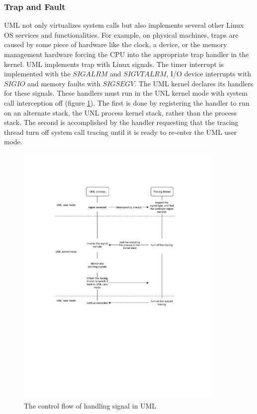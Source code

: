 \subsubsection{Trap and Fault}


UML not only virtualizes system calls but also implements several other Linux OS services and functionalities. For example, on physical machines, traps are caused by some piece of hardware like the clock, a device, or the memory management hardware forcing the CPU into the appropriate trap handler in the kernel. UML implements trap with Linux signals. The timer interrupt is implemented with the $SIGALRM$ and $SIGVTALRM$, I/O device interrupts with $SIGIO$ and memory faults with $SIGSEGV$. The UML kernel declares its handlers for these signals. These handlers must run in the UNL kernel mode with system call interception off (figure \ref{fig:uml-sig}). The first is done by registering the handler to run on an alternate stack, the UNL process kernel stack, rather than the process stack. The second is accomplished by the handler requesting that the tracing thread turn off system call tracing until it is ready to re-enter the UML user mode.

\begin{figure}[h]
    \centering
    \includegraphics[clip, trim=0.5cm 16cm 3cm 0.5cm, width=0.9\textwidth, height=0.8\textwidth]{ch2/UML-sig.pdf}
    \caption{The control flow of handling signal in UML}
    \label{fig:uml-sig}
\end{figure}

